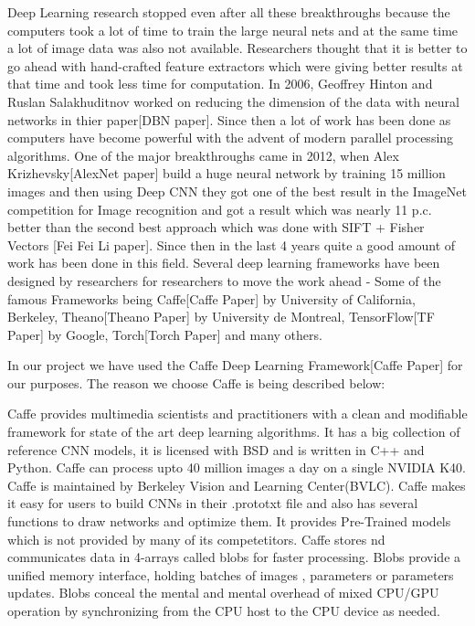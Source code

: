 Deep Learning research stopped even after all these breakthroughs because the computers took a lot of time to train the large neural nets and at the same time a lot of image data was also not available. Researchers thought that it is better to go ahead with hand-crafted feature extractors which were giving better results at that time and took less time for computation. In 2006, Geoffrey Hinton and Ruslan Salakhuditnov worked on reducing the dimension of the data with neural networks in thier paper[DBN paper]. Since then a lot of work has been done as computers have become powerful with the advent of modern parallel processing algorithms. One of the major breakthroughs came in 2012, when Alex Krizhevsky[AlexNet paper] build a huge neural network by training 15 million images and then using Deep CNN they got one of the best result in the ImageNet competition for Image recognition and got a result which  was nearly 11 p.c. better than the second best approach which was done with SIFT + Fisher Vectors [Fei Fei Li paper]. Since then in the last 4 years quite a good amount of work has been done in this field. Several deep learning frameworks have been designed by researchers for researchers to move the work ahead - Some of the famous Frameworks being Caffe[Caffe Paper] by University of California, Berkeley, Theano[Theano Paper] by University de Montreal, TensorFlow[TF Paper] by Google, Torch[Torch Paper] and many others.

In our project we have used the Caffe Deep Learning Framework[Caffe Paper] for our purposes. The reason we choose Caffe is being described below:

Caffe provides multimedia scientists and practitioners with a clean and modifiable framework for state of the art deep learning algorithms. It has a big collection of reference CNN models, it is licensed with BSD and is written in C++ and Python. Caffe can process upto 40 million images a day on a single NVIDIA K40. Caffe is maintained by Berkeley Vision and Learning Center(BVLC). Caffe makes it easy for users to build CNNs in their .prototxt file and also has several functions to draw networks and optimize them. It provides Pre-Trained models which is not provided by many of its competetitors. Caffe stores nd communicates data in 4-arrays called blobs for faster processing. Blobs provide a unified memory interface, holding batches of images , parameters or parameters updates. Blobs conceal the mental and mental overhead of mixed CPU/GPU operation by synchronizing from the CPU host to the CPU device as needed. 

